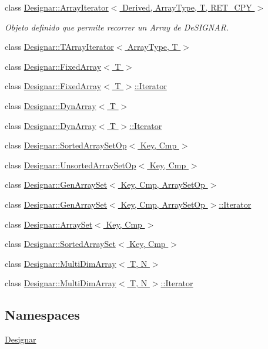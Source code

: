 \begin{DoxyCompactItemize}
\item 
class \hyperlink{class_designar_1_1_array_iterator}{Designar\+::\+Array\+Iterator$<$ Derived, Array\+Type, T, R\+E\+T\+\_\+\+C\+P\+Y $>$}
\begin{DoxyCompactList}\small\item\em Objeto definido que permite recorrer un Array de De\+S\+I\+G\+N\+AR. \end{DoxyCompactList}\item 
class \hyperlink{class_designar_1_1_t_array_iterator}{Designar\+::\+T\+Array\+Iterator$<$ Array\+Type, T $>$}
\item 
class \hyperlink{class_designar_1_1_fixed_array}{Designar\+::\+Fixed\+Array$<$ T $>$}
\item 
class \hyperlink{class_designar_1_1_fixed_array_1_1_iterator}{Designar\+::\+Fixed\+Array$<$ T $>$\+::\+Iterator}
\item 
class \hyperlink{class_designar_1_1_dyn_array}{Designar\+::\+Dyn\+Array$<$ T $>$}
\item 
class \hyperlink{class_designar_1_1_dyn_array_1_1_iterator}{Designar\+::\+Dyn\+Array$<$ T $>$\+::\+Iterator}
\item 
class \hyperlink{class_designar_1_1_sorted_array_set_op}{Designar\+::\+Sorted\+Array\+Set\+Op$<$ Key, Cmp $>$}
\item 
class \hyperlink{class_designar_1_1_unsorted_array_set_op}{Designar\+::\+Unsorted\+Array\+Set\+Op$<$ Key, Cmp $>$}
\item 
class \hyperlink{class_designar_1_1_gen_array_set}{Designar\+::\+Gen\+Array\+Set$<$ Key, Cmp, Array\+Set\+Op $>$}
\item 
class \hyperlink{class_designar_1_1_gen_array_set_1_1_iterator}{Designar\+::\+Gen\+Array\+Set$<$ Key, Cmp, Array\+Set\+Op $>$\+::\+Iterator}
\item 
class \hyperlink{class_designar_1_1_array_set}{Designar\+::\+Array\+Set$<$ Key, Cmp $>$}
\item 
class \hyperlink{class_designar_1_1_sorted_array_set}{Designar\+::\+Sorted\+Array\+Set$<$ Key, Cmp $>$}
\item 
class \hyperlink{class_designar_1_1_multi_dim_array}{Designar\+::\+Multi\+Dim\+Array$<$ T, N $>$}
\item 
class \hyperlink{class_designar_1_1_multi_dim_array_1_1_iterator}{Designar\+::\+Multi\+Dim\+Array$<$ T, N $>$\+::\+Iterator}
\end{DoxyCompactItemize}
\subsection*{Namespaces}
\begin{DoxyCompactItemize}
\item 
 \hyperlink{namespace_designar}{Designar}
\end{DoxyCompactItemize}
